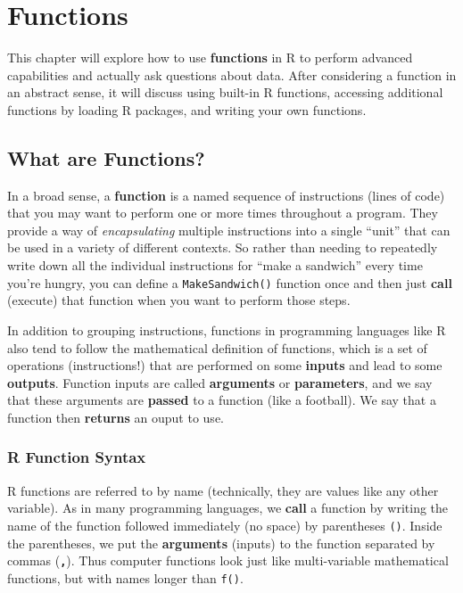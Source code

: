 \documentclass[]{book}
\theoremstyle{definition}
\theoremstyle{definition}
\theoremstyle{remark}
\begin{document}
\hypertarget{functions}{\chapter{Functions}\label{functions}}

This chapter will explore how to use \textbf{functions} in R to perform
advanced capabilities and actually ask questions about data. After
considering a function in an abstract sense, it will discuss using
built-in R functions, accessing additional functions by loading R
packages, and writing your own functions.

\section{What are Functions?}\label{what-are-functions}

In a broad sense, a \textbf{function} is a named sequence of
instructions (lines of code) that you may want to perform one or more
times throughout a program. They provide a way of \emph{encapsulating}
multiple instructions into a single ``unit'' that can be used in a
variety of different contexts. So rather than needing to repeatedly
write down all the individual instructions for ``make a sandwich'' every
time you're hungry, you can define a \texttt{MakeSandwich()} function
once and then just \textbf{call} (execute) that function when you want
to perform those steps.

In addition to grouping instructions, functions in programming languages
like R also tend to follow the mathematical definition of functions,
which is a set of operations (instructions!) that are performed on some
\textbf{inputs} and lead to some \textbf{outputs}. Function inputs are
called \textbf{arguments} or \textbf{parameters}, and we say that these
arguments are \textbf{passed} to a function (like a football). We say
that a function then \textbf{returns} an ouput to use.

\subsection{R Function Syntax}\label{r-function-syntax}

R functions are referred to by name (technically, they are values like
any other variable). As in many programming languages, we \textbf{call}
a function by writing the name of the function followed immediately (no
space) by parentheses \texttt{()}. Inside the parentheses, we put the
\textbf{arguments} (inputs) to the function separated by commas
(\textbf{\texttt{,}}). Thus computer functions look just like
multi-variable mathematical functions, but with names longer than
\texttt{f()}.
\end{document}
